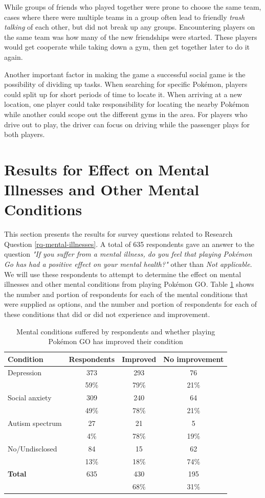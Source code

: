While groups of friends who played together were prone to choose the same team, cases where there were multiple teams in a group often lead to friendly \emph{trash talking} of each other, but did not break up any groups. Encountering players on the same team was how many of the new friendships were started. These players would get cooperate while taking down a gym, then get together later to do it again.

Another important factor in making the game a successful social game is the possibility of dividing up tasks. When searching for specific Pokémon, players could split up for short periods of time to locate it. When arriving at a new location, one player could take responsibility for locating the nearby Pokémon while another could scope out the different gyms in the area. For players who drive out to play, the driver can focus on driving while the passenger plays for both players.

\section{Results for Effect on Mental Illnesses and Other Mental Conditions}

This section presents the results for survey questions related to Research Question \ref{rq-mental-illnesses}. A total of 635 respondents gave an answer to the question \emph{"If you suffer from a mental illness, do you feel that playing Pokémon Go has had a positive effect on your mental health?"} other than \emph{Not applicable}. We will use these respondents to attempt to determine the effect on mental illnesses and other mental conditions from playing Pokémon GO. Table \ref{tbl:mental-conditions-effect} shows the number and portion of respondents for each of the mental conditions that were supplied as options, and the number and portion of respondents for each of these conditions that did or did not experience and improvement.

\begin{table}[h]
	\centering
	\caption{Mental conditions suffered by respondents and whether playing Pokémon GO has improved their condition}
	\label{tbl:mental-conditions-effect}
	\begin{tabular}{|l|c|c|c|}
		\hline
		\textbf{Condition} & \textbf{Respondents} & \textbf{Improved} & \textbf{No improvement}\\
		\hline\hline
		Depression		& 373	& 293	& 76\\
						& 59\%	& 79\%	& 21\%\\\hline
		Social anxiety	& 309	& 240	& 64\\
						& 49\%	& 78\%	& 21\%\\\hline
		Autism spectrum	& 27	& 21	& 5\\
						& 4\%	& 78\%	& 19\%\\\hline
		No/Undisclosed	& 84	& 15	& 62\\
						& 13\%	& 18\%	& 74\%\\\hline
		\hline
		\textbf{Total}	& 635	& 430	& 195\\
						& 		& 68\%	& 31\%\\\hline
	\end{tabular}
\end{table}

